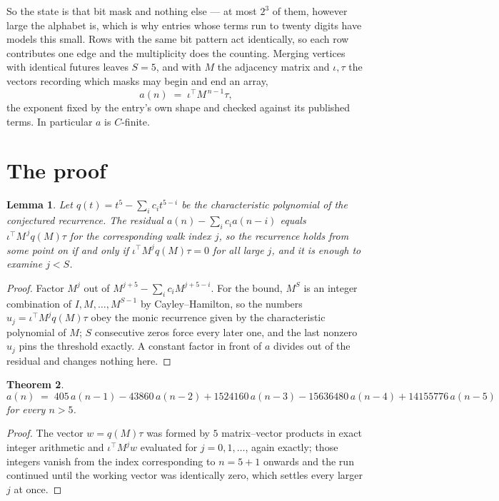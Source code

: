 \documentclass[11pt,a4paper]{article}
\theoremstyle{plain}
\newtheorem{theorem}{Theorem}
\newtheorem{lemma}[theorem]{Lemma}
\theoremstyle{definition}
\begin{document}
So the state is that bit mask and nothing else --- at most $2^{3}$ of them, however large the alphabet is, which is why entries whose terms run to twenty digits have models this small. Rows with the same bit pattern act identically, so each row contributes one edge and the multiplicity does the counting. Merging vertices with identical futures leaves $S=5$, and with $M$ the adjacency matrix and $\iota,\tau$ the vectors recording which masks may begin and end an array,
\[
a(n)\;=\;\iota^{\!\top}M^{\,n-1}\tau ,
\]
the exponent fixed by the entry's own shape and checked against its published terms. In
particular $a$ is $C$-finite.

\section{The proof}

\begin{lemma}\label{lem:crit}
Let $q(t)=t^{5}-\sum_i c_it^{5-i}$ be the characteristic polynomial of the
conjectured recurrence. The residual $a(n)-\sum_ic_ia(n-i)$ equals
$\iota^{\!\top}M^{\,j}q(M)\tau$ for the corresponding walk index $j$, so the recurrence
holds from some point on if and only if $\iota^{\!\top}M^{j}q(M)\tau=0$ for all large $j$,
and it is enough to examine $j<S$.
\end{lemma}

\begin{proof}
Factor $M^{j}$ out of $M^{j+5}-\sum_ic_iM^{j+5-i}$. For the bound, $M^{S}$
is an integer combination of $I,M,\dots,M^{S-1}$ by Cayley--Hamilton, so the numbers
$u_j=\iota^{\!\top}M^{j}q(M)\tau$ obey the monic recurrence given by the characteristic
polynomial of $M$; $S$ consecutive zeros force every later one, and the last nonzero $u_j$
pins the threshold exactly. A constant factor in front of $a$ divides out of the residual and
changes nothing here.
\end{proof}

\begin{theorem}
\[
a(n)\;=\;405\,a(n-1) - 43860\,a(n-2) + 1524160\,a(n-3) - 15636480\,a(n-4) + 14155776\,a(n-5)
\]
for every $n>5$.
\end{theorem}

\begin{proof}
The vector $w=q(M)\tau$ was formed by $5$ matrix--vector products in exact integer
arithmetic and $\iota^{\!\top}M^{j}w$ evaluated for $j=0,1,\dots$, again exactly; those
integers vanish from the index corresponding to $n=5+1$ onwards and the run continued
until the working vector was identically zero, which settles every larger $j$ at once.
\end{proof}
\end{document}
